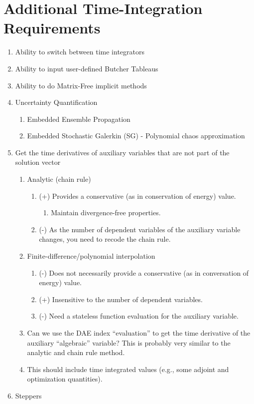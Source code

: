 \section{Additional Time-Integration Requirements}
\begin{enumerate}
\item Ability to switch between time integrators
\item Ability to input user-defined Butcher Tableaus
\item Ability to do Matrix-Free implicit methods
\item Uncertainty Quantification

\begin{enumerate}
\item Embedded Ensemble Propagation
\item Embedded Stochastic Galerkin (SG) - Polynomial chaos approximation
\end{enumerate}
\item Get the time derivatives of auxiliary variables that are not part
of the solution vector

\begin{enumerate}
\item Analytic (chain rule)

\begin{enumerate}
\item (+) Provides a conservative (as in conservation of energy) value.

\begin{enumerate}
\item Maintain divergence-free properties.
\end{enumerate}
\item (-) As the number of dependent variables of the auxiliary variable
changes, you need to recode the chain rule.
\end{enumerate}
\item Finite-difference/polynomial interpolation

\begin{enumerate}
\item (-) Does not necessarily provide a conservative (as in conversation
of energy) value.
\item (+) Insensitive to the number of dependent variables.
\item (-) Need a stateless function evaluation for the auxiliary variable.
\end{enumerate}
\item Can we use the DAE index ``evaluation'' to get the time derivative
of the auxiliary ``algebraic'' variable? This is probably very similar
to the analytic and chain rule method.
\item This should include time integrated values (e.g., some adjoint and
optimization quantities).
\end{enumerate}
\item Steppers


\end{enumerate}
